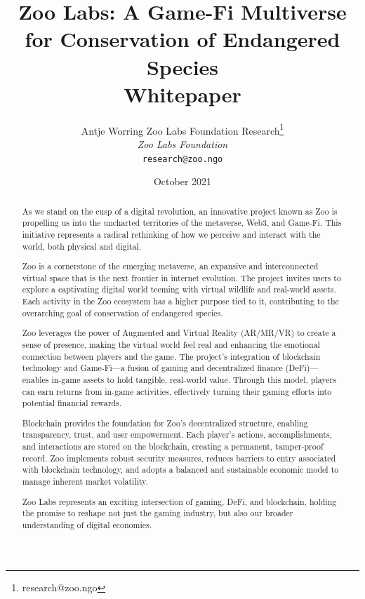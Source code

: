 \documentclass[11pt,letterpaper]{article}
\title{\textbf{Zoo Labs: A Game-Fi Multiverse for Conservation of Endangered Species}\\
\large Whitepaper}
\author{
Antje Worring \quad Zoo Labs Foundation Research\thanks{research@zoo.ngo}\\
\textit{Zoo Labs Foundation}\\
\texttt{research@zoo.ngo}
}
\date{October 2021}
\begin{document}
\zoocoverpage

\begin{abstract}
\noindent
As we stand on the cusp of a digital revolution, an innovative project known as Zoo is propelling us into the uncharted territories of the metaverse, Web3, and Game-Fi. This initiative represents a radical rethinking of how we perceive and interact with the world, both physical and digital.

Zoo is a cornerstone of the emerging metaverse, an expansive and interconnected virtual space that is the next frontier in internet evolution. The project invites users to explore a captivating digital world teeming with virtual wildlife and real-world assets. Each activity in the Zoo ecosystem has a higher purpose tied to it, contributing to the overarching goal of conservation of endangered species.

Zoo leverages the power of Augmented and Virtual Reality (AR/MR/VR) to create a sense of presence, making the virtual world feel real and enhancing the emotional connection between players and the game. The project's integration of blockchain technology and Game-Fi---a fusion of gaming and decentralized finance (DeFi)---enables in-game assets to hold tangible, real-world value. Through this model, players can earn returns from in-game activities, effectively turning their gaming efforts into potential financial rewards.

Blockchain provides the foundation for Zoo's decentralized structure, enabling transparency, trust, and user empowerment. Each player's actions, accomplishments, and interactions are stored on the blockchain, creating a permanent, tamper-proof record. Zoo implements robust security measures, reduces barriers to entry associated with blockchain technology, and adopts a balanced and sustainable economic model to manage inherent market volatility.

Zoo Labs represents an exciting intersection of gaming, DeFi, and blockchain, holding the promise to reshape not just the gaming industry, but also our broader understanding of digital economies.
\end{abstract}

\tableofcontents
\newpage







\end{document}
